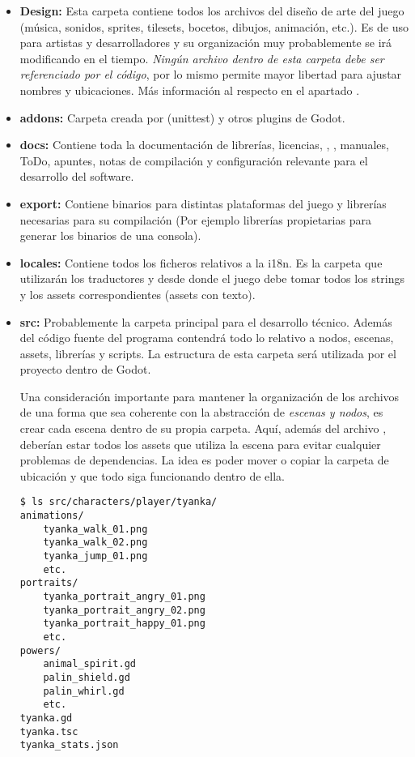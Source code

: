 \begin{itemize}
\item \textbf{Design:} Esta carpeta contiene todos los archivos del diseño de arte del juego (música, sonidos, sprites, tilesets, bocetos, dibujos, animación, etc.). Es de uso para artistas y desarrolladores y su organización muy probablemente se irá modificando en el tiempo. \emph{Ningún archivo dentro de esta carpeta debe ser referenciado por el código}, por lo mismo permite mayor libertad para ajustar nombres y ubicaciones. Más información al respecto en el apartado .

\item \textbf{addons:} Carpeta creada por  (unittest) y otros plugins de Godot.

\item \textbf{docs:} Contiene toda la documentación de librerías, licencias, , , manuales, ToDo, apuntes, notas de compilación y configuración relevante para el desarrollo del software.

\item \textbf{export:} Contiene binarios para distintas plataformas del juego y librerías necesarias para su compilación (Por ejemplo librerías propietarias para generar los binarios de una consola).

\item \textbf{locales:} Contiene todos los ficheros relativos a la i18n. Es la carpeta que utilizarán los traductores y desde donde el juego debe tomar todos los strings y los assets correspondientes (assets con texto).

\item \textbf{src:} Probablemente la carpeta principal para el desarrollo técnico. Además del código fuente del programa contendrá todo lo relativo a nodos, escenas, assets, librerías y scripts. La estructura de esta carpeta será utilizada por el proyecto dentro de Godot.

Una consideración importante para mantener la organización de los archivos de una forma que sea coherente con la abstracción de \textit{escenas y nodos}, es crear cada escena dentro de su propia carpeta. Aquí, además del archivo , deberían estar todos los assets que utiliza la escena para evitar cualquier problemas de dependencias. La idea es poder mover o copiar la carpeta de ubicación y que todo siga funcionando dentro de ella.

\begin{lstlisting}
$ ls src/characters/player/tyanka/
animations/
    tyanka_walk_01.png
    tyanka_walk_02.png
    tyanka_jump_01.png
    etc.
portraits/
    tyanka_portrait_angry_01.png
    tyanka_portrait_angry_02.png
    tyanka_portrait_happy_01.png
    etc.
powers/
    animal_spirit.gd
    palin_shield.gd
    palin_whirl.gd
    etc.
tyanka.gd
tyanka.tsc
tyanka_stats.json
\end{lstlisting}


\end{itemize}
